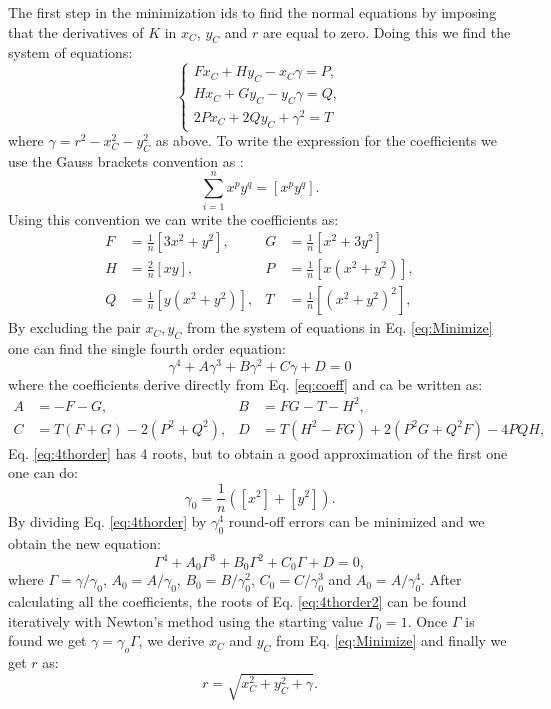 The first step in the minimization ids to find the normal equations by imposing that the derivatives of $K$ in $x_C$, $y_C$ and $r$ are equal to zero. Doing this we find the system of equations:
\begin{equation}\label{eq:Minimize}
\begin{cases} 
Fx_C+Hy_C-x_C\gamma=P, \\
Hx_C+Gy_C-y_C\gamma=Q, \\
2Px_C+2Qy_C+\gamma^2=T
\end{cases}
\end{equation}
where $\gamma=r^2-x_C^2-y_C^2$ as above. To write the expression for the coefficients we use the Gauss brackets convention as :
\begin{equation}
    \sum_{i=1}^{n}x^py^q=[x^py^q].
\end{equation}
Using this convention we can write the coefficients as:
\begin{align}\label{eq:coeff}
F&=\frac{1}{n}[3x^2+y^2],&  G &=\frac{1}{n}[x^2+3y^2] \nonumber\\
H&=\frac{2}{n}[xy],      &  P&=\frac{1}{n}[x(x^2+y^2)],   \\
Q&=\frac{1}{n}[y(x^2+y^2)],   &  T&=\frac{1}{n}[(x^2+y^2)^2] \nonumber, 
\end{align}
By excluding the pair $x_C,y_C$ from the system of equations in Eq. \ref{eq:Minimize} one can find the single fourth order equation:
\begin{equation}\label{eq:4thorder}
    \gamma^4+A\gamma^3+B\gamma^2+C\gamma+D=0
\end{equation}
where the coefficients derive directly from Eq. \ref{eq:coeff} and ca be written as:
\begin{align}\label{eq:coeff2}
A &= -F-G,&  B &=FG-T-H^2, \\
C&=T(F+G)-2(P^2+Q^2),      &  D&=T(H^2-FG)+2(P^2G+Q^2F)-4PQH, \nonumber  
\end{align}
Eq. \ref{eq:4thorder} has 4 roots, but to obtain a good approximation of the first one one can do:
\begin{equation}
    \gamma_0=\frac{1}{n}([x^2]+[y^2]).
\end{equation}
By dividing Eq. \ref{eq:4thorder} by $\gamma_0^4$ round-off errors can be minimized and we obtain the new equation:
\begin{equation}\label{eq:4thorder2}
    \Gamma^4+A_0\Gamma^3+B_0\Gamma^2+C_0\Gamma+D=0,
\end{equation}
where $\Gamma = \gamma/\gamma_0$, $A_0=A/\gamma_0$, $B_0=B/\gamma_0^2$, $C_0=C/\gamma_0^3$ and $A_0=A/\gamma_0^4$. After calculating all the coefficients, the roots of Eq. \ref{eq:4thorder2} can be found iteratively with Newton's method using the starting value $\Gamma_0=1$. Once $\Gamma$ is found we get $\gamma = \gamma_o\Gamma$, we derive $x_C$ and $y_C$ from Eq. \ref{eq:Minimize}  and finally we get $r$ as:
\begin{equation}
    r=\sqrt{x_C^2+y_C^2+\gamma}.
\end{equation}

